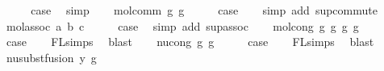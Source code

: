 \begin{isabellebody}
\ \ \isamarkupfalse%
\ \isamarkupfalse%
\ {\isacharquery}{\kern0pt}case\ \isamarkupfalse%
\ simp\isanewline
{}\isamarkupfalse%
\isanewline
\ \ \isamarkupfalse%
\ {\isacharparenleft}{\kern0pt}mol{\isacharunderscore}{\kern0pt}comm\ g{}\ g{}{\isacharparenright}{\kern0pt}\isanewline
\ \ \isamarkupfalse%
\ \isamarkupfalse%
\ {\isacharquery}{\kern0pt}case\isanewline
\ \ \isamarkupfalse%
\ {\isacharparenleft}{\kern0pt}simp\ add{\isacharcolon}{\kern0pt}\ sup{\isacharunderscore}{\kern0pt}commute{\isacharparenright}{\kern0pt}\isanewline
{}\isamarkupfalse%
\isanewline
\ \ \isamarkupfalse%
\ {\isacharparenleft}{\kern0pt}mol{\isacharunderscore}{\kern0pt}assoc\ a\ b\ c{\isacharparenright}{\kern0pt}\isanewline
\ \ \isamarkupfalse%
\ \isamarkupfalse%
\ {\isacharquery}{\kern0pt}case\ \isamarkupfalse%
\ {\isacharparenleft}{\kern0pt}simp\ add{\isacharcolon}{\kern0pt}\ sup{\isacharunderscore}{\kern0pt}assoc{\isacharparenright}{\kern0pt}\isanewline
{}\isamarkupfalse%
\isanewline
\ \ \isamarkupfalse%
\ {\isacharparenleft}{\kern0pt}mol{\isacharunderscore}{\kern0pt}cong\ g{}\ g{}\ g{}{\isacharprime}{\kern0pt}\ g{}{\isacharprime}{\kern0pt}{\isacharparenright}{\kern0pt}\isanewline
\ \ \isamarkupfalse%
\ \isamarkupfalse%
\ {\isacharquery}{\kern0pt}case\isanewline
\ \ \isamarkupfalse%
\ FL{\isachardot}{\kern0pt}simps{\isacharparenleft}{\kern0pt}{}{\isacharparenright}{\kern0pt}\ \isamarkupfalse%
\ blast\isanewline
{}\isamarkupfalse%
\isanewline
\ \ \isamarkupfalse%
\ {\isacharparenleft}{\kern0pt}nu{\isacharunderscore}{\kern0pt}cong\ g\ g{\isacharprime}{\kern0pt}{\isacharparenright}{\kern0pt}\isanewline
\ \ \isamarkupfalse%
\ \isamarkupfalse%
\ {\isacharquery}{\kern0pt}case\isanewline
\ \ \isamarkupfalse%
\ FL{\isachardot}{\kern0pt}simps{\isacharparenleft}{\kern0pt}{}{\isacharparenright}{\kern0pt}\ \isamarkupfalse%
\ blast\isanewline
{}\isamarkupfalse%
\isanewline
\ \ \isamarkupfalse%
\ {\isacharparenleft}{\kern0pt}nu{\isacharunderscore}{\kern0pt}subst{\isacharunderscore}{\kern0pt}fusion{}\ y\ g{\isacharparenright}{\kern0pt}\isanewline

\end{isabellebody}
